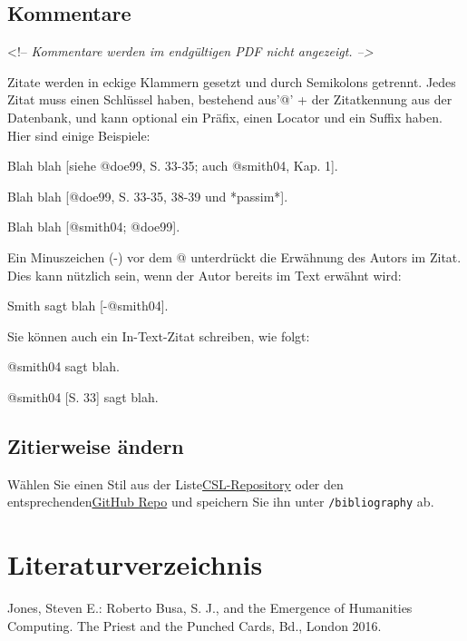 \documentclass[12pt,de-CH,twoside,openright]{report}
\newenvironment{Shaded}{\begin{snugshade}}{\end{snugshade}}
\newcommand{\CommentTok}[1]{\textcolor[rgb]{0.56,0.35,0.01}{\textit{#1}}}
\newcommand{\NormalTok}[1]{#1}
\begin{document}
\hypertarget{kommentare}{%
\section{Kommentare}\label{kommentare}}

\begin{Shaded}
\begin{Highlighting}[]
\NormalTok{<!--}\CommentTok{ Kommentare werden im endgültigen PDF nicht angezeigt. -->}
\end{Highlighting}
\end{Shaded}

\begin{Shaded}
\begin{Highlighting}[]
\NormalTok{Zitate werden in eckige Klammern gesetzt und durch Semikolons getrennt. Jedes Zitat muss einen Schlüssel haben, bestehend aus'@' + der Zitatkennung aus der Datenbank, und kann optional ein Präfix, einen Locator und ein Suffix haben. Hier sind einige Beispiele:}

\NormalTok{Blah blah [siehe @doe99, S. 33-35; auch @smith04, Kap. 1].}

\NormalTok{Blah blah [@doe99, S. 33-35, 38-39 und *passim*].}

\NormalTok{Blah blah [@smith04; @doe99].}

\NormalTok{Ein Minuszeichen (-) vor dem @ unterdrückt die Erwähnung des Autors im Zitat. Dies kann nützlich sein, wenn der Autor bereits im Text erwähnt wird:}

\NormalTok{Smith sagt blah [-@smith04].}

\NormalTok{Sie können auch ein In-Text-Zitat schreiben, wie folgt:}

\NormalTok{@smith04 sagt blah.}

\NormalTok{@smith04 [S. 33] sagt blah.}
\end{Highlighting}
\end{Shaded}

\hypertarget{zitierweise-andern}{%
\section{Zitierweise ändern}\label{zitierweise-andern}}

Wählen Sie einen Stil aus der
Liste\href{https://www.zotero.org/styles}{CSL-Repository} oder den
entsprechenden\href{https://github.com/citation-style-language/styles}{GitHub
Repo} und speichern Sie ihn unter \texttt{/bibliography} ab.

\hypertarget{literaturverzeichnis}{%
\chapter*{Literaturverzeichnis}\label{literaturverzeichnis}}

\hypertarget{refs}{}
\leavevmode\hypertarget{ref-jones2016}{}%
Jones, Steven E.: Roberto Busa, S. J., and the Emergence of Humanities
Computing. The Priest and the Punched Cards, Bd., London 2016.


\newpage

\end{document}
